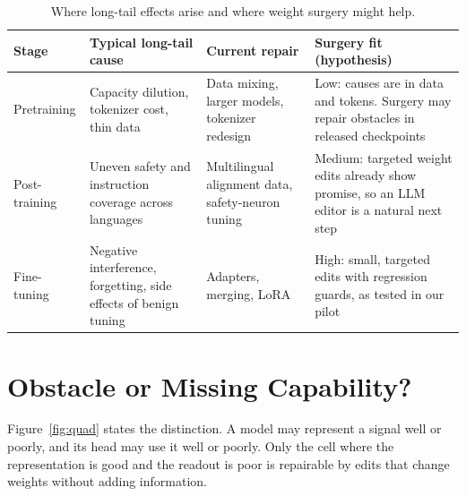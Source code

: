 \documentclass[11pt]{article}
\begin{document}
\begin{table}[t]
\centering\small
\begin{tabular}{p{1.8cm} p{4.2cm} p{4.0cm} p{4.4cm}}
\toprule
Stage & Typical long-tail cause & Current repair & Surgery fit (hypothesis) \\
\midrule
Pretraining & Capacity dilution, tokenizer cost, thin data \citep{conneau2020xlmr,chang2024curse,petrov2023tokenizers} & Data mixing, larger models, tokenizer redesign & Low: causes are in data and tokens. Surgery may repair obstacles in released checkpoints \\
Post-training & Uneven safety and instruction coverage across languages \citep{yong2023lowresource,deng2024multijail} & Multilingual alignment data, safety-neuron tuning \citep{zhang2026safetyneurons,liang2026sparse} & Medium: targeted weight edits already show promise, so an LLM editor is a natural next step \\
Fine-tuning & Negative interference, forgetting, side effects of benign tuning \citep{biderman2024lora,qi2024finetuning} & Adapters, merging, LoRA & High: small, targeted edits with regression guards, as tested in our pilot \\
\bottomrule
\end{tabular}
\caption{Where long-tail effects arise and where weight surgery might help.}
\label{tab:pipeline}
\end{table}

\section{Obstacle or Missing Capability?}
\label{sec:diag}
Figure~\ref{fig:quad} states the distinction. A model may represent a signal well or poorly, and its head may use it well or poorly. Only the cell where the representation is good and the readout is poor is repairable by edits that change weights without adding information.
\end{document}
